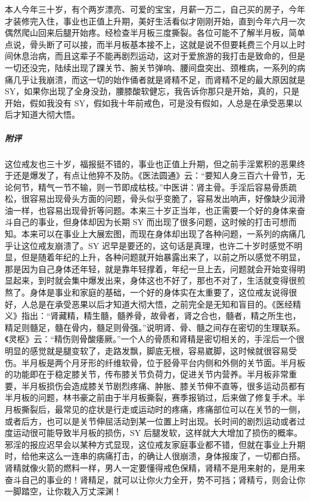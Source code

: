 \begin{case}
    本人今年三十岁，有个两岁漂亮、可爱的宝宝，月薪一万二，自己买的房子，今年才装修完入住，事业也正值上升期，美好生活看似才刚刚开始，直到今年六月一次偶然爬山回来后腿开始疼。经检查半月板三度撕裂。各位可能不了解半月板，简单点说，骨头断了可以接，而半月板基本接不上，这就是说不但要耗费三个月以上时间休息治病，而且这辈子不能再剧烈运动，这对于爱旅游的我打击是致命的，但是一切还没完，陆续出现了踝关节、腕关节弹响、腰间盘突出、颈椎病，一系列的病痛几乎让我崩溃，而这一切的始作俑者就是肾精不足，而肾精不足的最大原因就是 SY，如果你出现了全身没劲，腰膝酸软健忘，我告诉你那只是开始，真的，只是开始，假如我没有 SY，假如我十年前戒色，可是没有假如，人总是在承受恶果以后才知道大彻大悟。
    \subparagraph{附评} 这位戒友也三十岁，福报挺不错的，事业也正值上升期，但之前手淫累积的恶果终于还是爆发了，有点让他猝不及防。《医法圆通》云：“要知人身三百六十骨节，无论何节，精气一节不输，则一节即成枯枝。”中医讲：肾主骨。手淫后容易骨质疏松，很容易出现骨头方面的问题，骨头似乎变脆了，容易发出响声，好像缺少润滑油一样，也容易出现骨折等问题。本来三十岁正当年，也正需要一个好的身体来奋斗自己的事业，但身体却因为长期 SY 而出现了很多问题，这时候的打击可想而知。本来可以在事业上大展宏图，而现在身体却出现了各种问题，一系列的病痛几乎让这位戒友崩溃了。SY 迟早是要还的，这句话是真理，也许二十岁时感觉不明显，但是随着年纪的上升，各种问题就开始暴露出来了，以前之所以感觉不明显，那是因为自己身体还年轻，就是靠年轻撑着，年纪一旦上去，问题就会开始变得明显起来，到时就会集中爆发出来，身体这也不好了，那也不对了，生活就变得很煎熬了。身体是事业和家庭的基础，一个好的身体实在太重要了，这位戒友说得很好，人总是在承受恶果以后才知道大彻大悟，之前完全是无知和盲目的。《医经精义》指出：“肾藏精，精生髓，髓养骨，故骨者，肾之合也，髓者，精之所生也，精足则髓足，髓在骨内，髓足则骨强。”说明肾、骨、髓之间存在密切的生理联系。《灵枢》云：“精伤则骨酸痿厥。”一个人的骨质和肾精是密切相关的，手淫后一个很明显的感觉就是腿变软了，走路发飘，脚底无根，容易崴脚，这时候就很容易受伤。半月板是两个月牙形的纤维软骨，位于胫骨平台内侧和外侧的关节面。半月板的功能即在于稳定膝关节，传布膝关节负荷力，促进关节内营养。半月板非常重要，半月板损伤会造成膝关节剧烈疼痛、肿胀、膝关节伸不直等，很多运动员都有半月板的问题，林书豪之前由于半月板撕裂，赛季报销过，后来做了修复手术。半月板撕裂后，最常见的症状是行走或运动时的疼痛，疼痛部位可以在关节的一侧，或者后方，也可以是关节伸屈活动到某一位置上时出现。长时间的剧烈运动或者过度运动很可能导致半月板的损伤，SY 后腿发软，这样就大大增加了损伤的概率。邪淫的报应迟早会以某种方式显现，这位戒友家庭事业都不错，但就在事业上升期时，给他来这么一连串的病痛打击，的确让人很崩溃，身体报废了，一切都白搭。肾精就像火箭的燃料一样，男人一定要懂得戒色保精，肾精不是用来射的，是用来奋斗自己的事业的！肾精足，就可以让你火力全开，势不可挡；肾精亏，则会让你一脚踏空，让你栽入万丈深渊！
\end{case}


